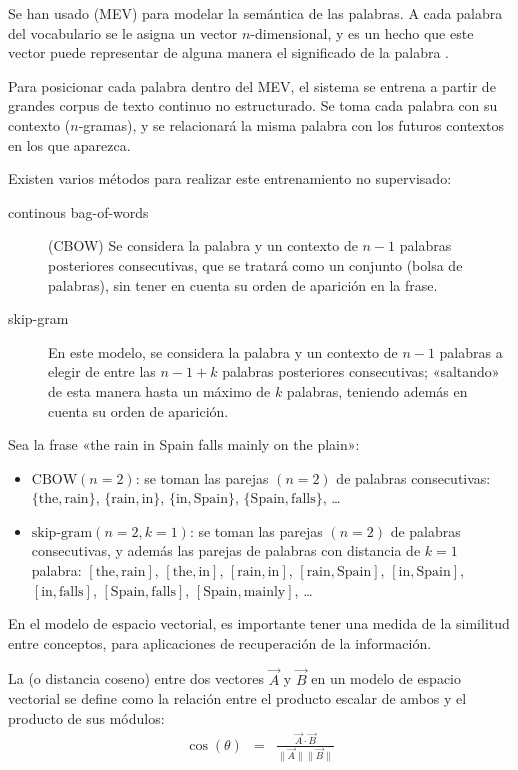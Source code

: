 Se han usado  (MEV) para modelar la semántica de las palabras. A cada palabra del vocabulario se le asigna un vector $n$-dimensional, y es un hecho que este vector puede representar de alguna manera el significado de la palabra \citep{Socher2012}.

Para posicionar cada palabra dentro del MEV, el sistema se entrena a partir de grandes corpus de texto continuo no estructurado. Se toma cada palabra con su contexto ($n$-gramas), y se relacionará la misma palabra con los futuros contextos en los que aparezca.

Existen varios métodos para realizar este entrenamiento no supervisado:
\begin{description}
\item[continous bag-of-words] (CBOW) Se considera la palabra y un contexto de $n-1$ palabras posteriores consecutivas, que se tratará como un conjunto (bolsa de palabras), sin tener en cuenta su orden de aparición en la frase.
\item[skip-gram]  En este modelo, se considera la palabra y un contexto de $n-1$ palabras a elegir de entre las $n-1 + k$ palabras posteriores consecutivas; «saltando» de esta manera hasta un máximo de $k$ palabras, teniendo además en cuenta su orden de aparición.
\end{description}

\begin{example}
Sea la frase «the rain in Spain falls mainly on the plain»:
\begin{itemize}
\item $\text{CBOW}(n=2)$: se toman las parejas $(n=2)$ de palabras consecutivas:
$\{\text{the}, \text{rain}\}$,
$\{\text{rain}, \text{in}\}$,
$\{\text{in}, \text{Spain}\}$,
$\{\text{Spain}, \text{falls}\}$, \ldots
\item $\text{skip-gram}(n=2,k=1)$: se toman las parejas $(n=2)$ de palabras consecutivas, y además las parejas de palabras con distancia de $k=1$ palabra: 
$[\text{the}, \text{rain}]$,
$[\text{the}, \text{in}]$,
$[\text{rain}, \text{in}]$,
$[\text{rain}, \text{Spain}]$, 
$[\text{in}, \text{Spain}]$, 
$[\text{in}, \text{falls}]$, 
$[\text{Spain}, \text{falls}]$, 
$[\text{Spain}, \text{mainly}]$, \ldots
\end{itemize}
\end{example}

En el modelo de espacio vectorial, es importante tener una medida de la similitud entre conceptos, para aplicaciones de recuperación de la información.
\begin{definition}
La  (o distancia coseno) entre dos vectores $\vec{A}$ y $\vec{B}$ en un modelo de espacio vectorial se define como la relación entre el producto escalar de ambos y el producto de sus módulos:
\begin{eqnarray}
\cos(\theta) &=& \frac{\vec{A}\cdot\vec{B}}{\|\vec{A}\| \|\vec{B}\|}
\end{eqnarray}
\end{definition}

